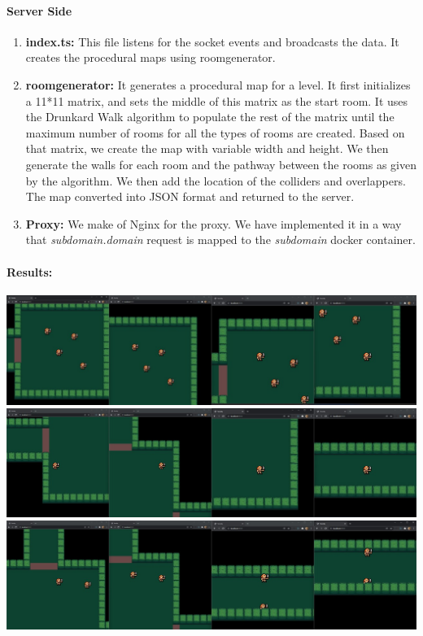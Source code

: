 \documentclass[oneside,12pt]{Classes/VTU}
\begin{document}
	\paragraph{Server Side}
	\begin{enumerate}
		\item \textbf{index.ts: }This file listens for the socket events and broadcasts the data. It creates the procedural maps using room\textunderscore generator. 
		
		\item \textbf{room\textunderscore generator: }It generates a procedural map for a level. It first initializes a 11*11 matrix, and sets the middle of this matrix as the start room. It uses the Drunkard Walk algorithm to populate the rest of the matrix until the maximum number of rooms for all the types of rooms are created.
		Based on that matrix, we create the map with variable width and height. We then generate the walls for each room and the pathway between the rooms as given by the algorithm. We then add the location of the colliders and overlappers. The map converted into JSON format and returned to the server.
		
		\item \textbf{Proxy: }We make of Nginx for the proxy. We have implemented it in a way that \emph{subdomain.domain} request is mapped to the \emph{subdomain} docker container.
		
	\end{enumerate}

	\paragraph{\LARGE{Results:\newline\newline}}
	\includegraphics[width=\linewidth]{f1.jpeg}
	\newline
	\newline
	\includegraphics[width=\linewidth]{f2.jpeg}
	\includegraphics[width=\linewidth]{f3.jpeg}
	\pagebreak
	\pagebreak
	
\end{document}
